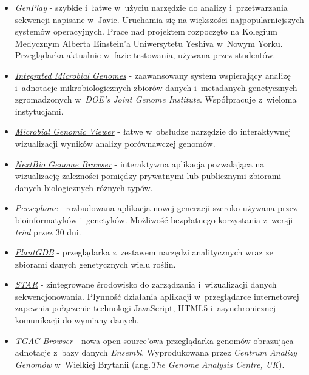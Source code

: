 \begin{itemize}
	\item \href{http://genplay.einstein.yu.edu/}{\emph{GenPlay}} - szybkie i~łatwe w~użyciu narzędzie do analizy i~przetwarzania sekwencji napisane w~Javie. Uruchamia się na większości najpopularniejszych systemów operacyjnych. Prace nad projektem rozpoczęto na Kolegium Medycznym Alberta Einstein'a Uniwersytetu Yeshiva w~Nowym Yorku. Przeglądarka aktualnie w~fazie testowania, używana przez studentów.
	
	\item \href{http://img.jgi.doe.gov/}{\emph{Integrated Microbial Genomes}} - zaawansowany system wspierający analizę i~adnotacje mikrobiologicznych zbiorów danych i~metadanych genetycznych zgromadzonych w~\emph{DOE's Joint Genome Institute}. Współpracuje z~wieloma instytucjami.
	
	\item \href{http://mgv2.cmbi.ru.nl/}{\emph{Microbial Genomic Viewer}} - łatwe w~obsłudze narzędzie do interaktywnej wizualizacji wyników analizy porównawczej genomów. 
	
	\item \href{https://www.nextbio.com}{\emph{NextBio Genome Browser}} - interaktywna aplikacja pozwalająca na wizualizację zależności pomiędzy prywatnymi lub publicznymi zbiorami danych biologicznych różnych typów.
	
	\item \href{http://persephone.net/}{\emph{Persephone}} - rozbudowana aplikacja nowej generacji szeroko używana przez bioinformatyków i~genetyków. Możliwość bezpłatnego korzystania z~wersji \emph{trial} przez 30 dni.
	
	\item \href{http://www.plantgdb.org/}{\emph{PlantGDB}} - przeglądarka z~zestawem narzędzi analitycznych wraz ze zbiorami danych genetycznych wielu roślin.
	
	\item \href{http://tabit.ucsd.edu/}{\emph{STAR}} - zintegrowane środowisko do zarządzania i~wizualizacji danych sekwencjonowania. Płynność działania aplikacji w~przeglądarce internetowej zapewnia połączenie technologi JavaScript, HTML5 i~asynchronicznej komunikacji do wymiany danych. 
	
	\item \href{http://tgac-browser.tgac.ac.uk/}{\emph{TGAC Browser}} - nowa open-source'owa przeglądarka genomów obrazująca adnotacje z~bazy danych \emph{Ensembl}. Wyprodukowana przez \emph{Centrum Analizy Genomów} w~Wielkiej Brytanii (ang.\emph{The Genome Analysis Centre, UK}).
	

\end{itemize}
